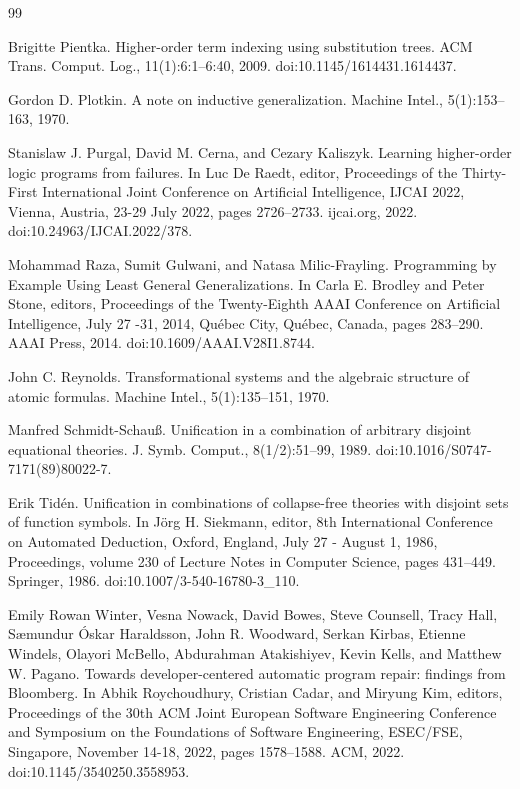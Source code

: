 \documentclass[10pt,a4paper]{amsart}
\begin{document}
\begin{thebibliography}{99}
\par\noindent  [37]  Brigitte Pientka.  Higher-order term indexing using substitution trees.  ACM Trans. Comput. Log., 11(1):6:1–6:40, 2009.  doi:10.1145/1614431.1614437.  
 
\par\noindent  [38]  Gordon D. Plotkin.  A note on inductive generalization.  Machine Intel., 5(1):153–163, 1970.  
 
\par\noindent  [39]  Stanislaw J. Purgal, David M. Cerna, and Cezary Kaliszyk.  Learning higher-order logic programs from failures.  In Luc De Raedt, editor, Proceedings of the Thirty-First International Joint Conference on Artificial Intelligence, IJCAI 2022, Vienna, Austria, 23-29 July 2022, pages 2726–2733. ijcai.org, 2022.  doi:10.24963/IJCAI.2022/378.  
 
\par\noindent  [40]  Mohammad Raza, Sumit Gulwani, and Natasa Milic-Frayling.  Programming by Example Using Least General Generalizations.  In Carla E. Brodley and Peter Stone, editors, Proceedings of the Twenty-Eighth AAAI Conference on Artificial Intelligence, July 27 -31, 2014, Québec City, Québec, Canada, pages 283–290. AAAI Press, 2014.  doi:10.1609/AAAI.V28I1.8744.  
 
\par\noindent  [41]  John C. Reynolds.  Transformational systems and the algebraic structure of atomic formulas.  Machine Intel., 5(1):135–151, 1970.  
 
\par\noindent  [42]  Manfred Schmidt-Schauß.  Unification in a combination of arbitrary disjoint equational theories.  J. Symb. Comput., 8(1/2):51–99, 1989.  doi:10.1016/S0747-7171(89)80022-7.  
 
\par\noindent  [43]  Erik Tidén.  Unification in combinations of collapse-free theories with disjoint sets of function symbols.  In Jörg H. Siekmann, editor, 8th International Conference on Automated Deduction, Oxford, England, July 27 - August 1, 1986, Proceedings, volume 230 of Lecture Notes in Computer Science, pages 431–449. Springer, 1986.  doi:10.1007/3-540-16780-3\_110.  
 
\par\noindent  [44]  Emily Rowan Winter, Vesna Nowack, David Bowes, Steve Counsell, Tracy Hall, Sæmundur Óskar Haraldsson, John R. Woodward, Serkan Kirbas, Etienne Windels, Olayori McBello, Abdurahman Atakishiyev, Kevin Kells, and Matthew W. Pagano.  Towards developer-centered automatic program repair: findings from Bloomberg.  In Abhik Roychoudhury, Cristian Cadar, and Miryung Kim, editors, Proceedings of the 30th ACM Joint European Software Engineering Conference and Symposium on the Foundations of Software Engineering, ESEC/FSE, Singapore, November 14-18, 2022, pages 1578–1588. ACM, 2022.  doi:10.1145/3540250.3558953.  
 

\end{thebibliography}
\end{document}

